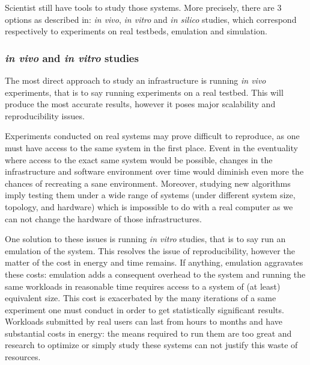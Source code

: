 Scientist still have tools to study those systems. More precisely, there are 3
options as described in\cite{legrand2015scheduling}: \textit{in vivo},
\textit{in vitro} and \textit{in silico} studies, which correspond respectively
to experiments on real testbeds, emulation and simulation.  


\subsubsection{\textit{in vivo} and \textit{in vitro} studies}

The most direct approach to study an infrastructure is running \textit{in vivo}
experiments, that is to say running experiments on a real testbed. This will
produce the most accurate results, however it poses major scalability and
reproducibility issues.

Experiments conducted on real systems may prove difficult to reproduce, as one
must have access to the same system in the first place. Event in the
eventuality where access to the exact same system would be possible, changes in
the infrastructure and software environment over time would diminish even more
the chances of recreating a sane environment. Moreover, studying new algorithms
imply testing them under a wide range of systems (under different system size,
topology, and hardware) which is impossible to do with a real computer as we
can not change the hardware of those infrastructures.

One solution to these issues is running \textit{in vitro} studies, that is to
say run an emulation of the system. This resolves the issue of reproducibility,
however the matter of the cost in energy and time remains. If anything,
emulation aggravates these costs: emulation adds a consequent overhead to the
system and running the same workloads in reasonable time requires access to a
system of (at least) equivalent size.  This cost is exacerbated by the many
iterations of a same experiment one must conduct in order to get statistically
significant results. Workloads submitted by real users can last from hours to
months and have substantial costs in energy: the means required to run them are
too great and research to optimize or simply study these systems can not
justify this waste of resources.

